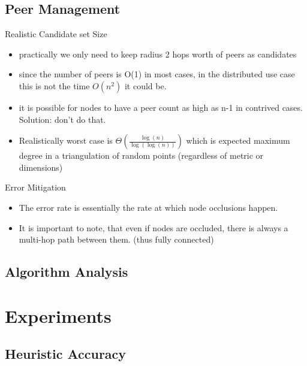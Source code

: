 \documentclass[8pt]{beamer}
\begin{document}
	
	
	
\subsection{Peer Management}
	\begin{frame}{Realistic Candidate set Size}
		\begin{itemize}
			\item practically we only need to keep radius 2 hops worth of peers as candidates
			\item since the number of peers is O(1) in most cases, in the distributed use case this is not the time $O(n^2)$ it could be.
			\item it is possible for nodes to have a peer count as high as n-1 in contrived cases. Solution: don't do that.
			\item Realistically worst case is $\Theta(\frac{\log(n)}{\log(\log(n))})$ which is expected maximum degree in a triangulation of random points (regardless of metric or dimensions) 
		\end{itemize}
	\end{frame}
	
	\begin{frame}{Error Mitigation}
		\begin{itemize}
			\item The error rate is essentially the rate at which node occlusions happen.
			\item It is important to note, that even if nodes are occluded, there is always a multi-hop path between them. (thus fully connected)
		\end{itemize}
	\end{frame}
	
\subsection{Algorithm Analysis}
	
	
\section{Experiments}
	
\subsection{Heuristic Accuracy}
\end{document}

